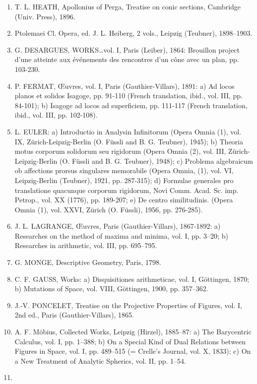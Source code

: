 \begin{enumerate}
\def\labelenumi{(\Roman{enumi})}
\setcounter{enumi}{3}
\item
  T. L. HEATH, Apollonius of Perga, Treatise on conic sections, Cambridge (Univ. Press), 1896.
\item
  Ptolemaei Cl. Opera, ed. J. L. Heiberg, 2 vols., Leipzig (Teubner), 1898–1903.
\item
  G. DESARGUES, WORKS\ldots vol. I, Paris (Leiber), 1864: Brouillon project d'une atteinte aux événements des rencontres d'un cône avec un plan, pp. 103-230.
\item
  P. FERMAT, Œuvres, vol. I, Paris (Gauthier-Villars), 1891: a) Ad locos planos et solidos Isagoge, pp. 91-110 (French translation, ibid., vol. III, pp. 84-101); b) Isagoge ad locos ad superficiem, pp. 111-117 (French translation, ibid., vol. III, pp. 102-108).
\item
  L. EULER: a) Introductio in Analysin Infinitorum (Opera Omnia (1), vol. IX, Zürich-Leipzig-Berlin (O. Füssli and B. G. Teubner), 1945); b) Theoria motus corporum solidorum seu rigidorum (Opera Omnia (2), vol. III, Zürich-Leipzig-Berlin (O. Füssli and B. G. Teubner), 1948); c) Problema algebraicum ob affections prorsus singulares memorabile (Opera Omnia, (1), vol. VI, Leipzig-Berlin (Teubner), 1921, pp. 287-315); d) Formulae generales pro translatione quacunque corporum rigidorum, Novi Comm. Acad. Sc. imp. Petrop., vol. XX (1776), pp. 189-207; e) De centro similitudinis. (Opera Omnia (1), vol. XXVI, Zürich (O. Füssli), 1956, pp. 276-285).
\item
  J. L. LAGRANGE, Œuvres, Paris (Gauthier-Villars), 1867-1892: a) Researches on the method of maxima and minima, vol. I, pp. 3–20; b) Researches in arithmetic, vol. III, pp. 695–795.
\item
  G. MONGE, Descriptive Geometry, Paris, 1798.
\item
  C. F. GAUSS, Works: a) Disquisitiones arithmeticae, vol. I, Göttingen, 1870; b) Mutations of Space, vol. VIII, Göttingen, 1900, pp. 357–362.
\item
  J.-V. PONCELET, Treatise on the Projective Properties of Figures, vol. I, 2nd ed., Paris (Gauthier-Villars), 1865.
\item
  A. F. Möbius, Collected Works, Leipzig (Hirzel), 1885–87: a) The Barycentric Calculus, vol. I, pp. 1–388; b) On a Special Kind of Dual Relations between Figures in Space, vol. I, pp. 489–515 (= Crelle's Journal, vol. X, 1833); c) On a New Treatment of Analytic Spherics, vol. II, pp. 1–54.
\item

\end{enumerate}
